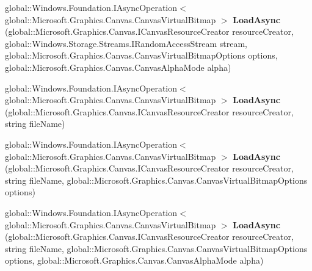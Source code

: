 \begin{DoxyCompactItemize}
global\+::\+Windows.\+Foundation.\+I\+Async\+Operation$<$ global\+::\+Microsoft.\+Graphics.\+Canvas.\+Canvas\+Virtual\+Bitmap $>$ {\bfseries Load\+Async} (global\+::\+Microsoft.\+Graphics.\+Canvas.\+I\+Canvas\+Resource\+Creator resource\+Creator, global\+::\+Windows.\+Storage.\+Streams.\+I\+Random\+Access\+Stream stream, global\+::\+Microsoft.\+Graphics.\+Canvas.\+Canvas\+Virtual\+Bitmap\+Options options, global\+::\+Microsoft.\+Graphics.\+Canvas.\+Canvas\+Alpha\+Mode alpha)
\item 
\mbox{\label{interface_microsoft_1_1_graphics_1_1_canvas_1_1_i_canvas_virtual_bitmap_statics_a330ce31be0bdb0b0a0d703fabfad4773}} 
global\+::\+Windows.\+Foundation.\+I\+Async\+Operation$<$ global\+::\+Microsoft.\+Graphics.\+Canvas.\+Canvas\+Virtual\+Bitmap $>$ {\bfseries Load\+Async} (global\+::\+Microsoft.\+Graphics.\+Canvas.\+I\+Canvas\+Resource\+Creator resource\+Creator, string file\+Name)
\item 
\mbox{\label{interface_microsoft_1_1_graphics_1_1_canvas_1_1_i_canvas_virtual_bitmap_statics_a76a39d531ac6da083f15563d74ccbb82}} 
global\+::\+Windows.\+Foundation.\+I\+Async\+Operation$<$ global\+::\+Microsoft.\+Graphics.\+Canvas.\+Canvas\+Virtual\+Bitmap $>$ {\bfseries Load\+Async} (global\+::\+Microsoft.\+Graphics.\+Canvas.\+I\+Canvas\+Resource\+Creator resource\+Creator, string file\+Name, global\+::\+Microsoft.\+Graphics.\+Canvas.\+Canvas\+Virtual\+Bitmap\+Options options)
\item 
\mbox{\label{interface_microsoft_1_1_graphics_1_1_canvas_1_1_i_canvas_virtual_bitmap_statics_af2af584f62356eb886a700899215d4a6}} 
global\+::\+Windows.\+Foundation.\+I\+Async\+Operation$<$ global\+::\+Microsoft.\+Graphics.\+Canvas.\+Canvas\+Virtual\+Bitmap $>$ {\bfseries Load\+Async} (global\+::\+Microsoft.\+Graphics.\+Canvas.\+I\+Canvas\+Resource\+Creator resource\+Creator, string file\+Name, global\+::\+Microsoft.\+Graphics.\+Canvas.\+Canvas\+Virtual\+Bitmap\+Options options, global\+::\+Microsoft.\+Graphics.\+Canvas.\+Canvas\+Alpha\+Mode alpha)
\item 
\mbox{\label{interface_microsoft_1_1_graphics_1_1_canvas_1_1_i_canvas_virtual_bitmap_statics_a230e794a4930f665b4ac7d220c2671da}} 

\end{DoxyCompactItemize}
